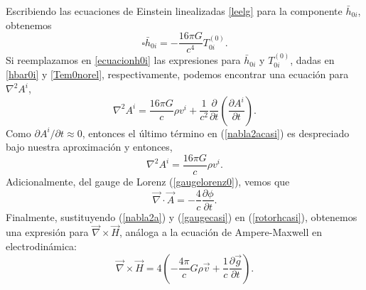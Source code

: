 Escribiendo las ecuaciones de Einstein linealizadas \eqref{leelg} para la componente $\bar{h}_{0i}$, obtenemos
\begin{equation}
\square \bar{h}_{0i}=-\frac{16\pi G}{c^4}T_{0i}^{(0)}.\label{ecuacionh0i}
\end{equation}
Si reemplazamos en \eqref{ecuacionh0i} las expresiones para $\bar{h}_{0i}$ y $T_{0i}^{(0)}$, dadas en \eqref{hbar0i} y \eqref{Tem0norel}, respectivamente, podemos encontrar una ecuación para ${\nabla}^2A^i$,
\begin{equation}
{\nabla}^2A^i=\frac{16\pi G}{c}\rho v^i+\frac{1}{c^2}\frac{\partial}{\partial t}\left(\frac{\partial A^i}{\partial t}\right).\label{nabla2acasi}
\end{equation}
Como $\partial A^i/\partial t\approx0$, entonces el último término en (\ref{nabla2acasi}) es despreciado bajo nuestra aprox\-imación y entonces,
\begin{equation}
{\nabla}^2A^i=\frac{16\pi G}{c}\rho v^i.\label{nabla2a}
\end{equation}
Adicionalmente, del gauge de Lorenz (\ref{gaugelorenz0}), vemos que
\begin{equation}
\vec{\nabla}\cdot\vec{A}=-\frac{4}{c}\frac{\partial \phi}{\partial t}.\label{gaugecasi}
\end{equation}
Finalmente, sustituyendo (\ref{nabla2a}) y (\ref{gaugecasi}) en (\ref{rotorhcasi}), obtenemos una expresión para $\vec{\nabla}\times\vec{H}$, análoga a la ecuación de Ampere-Maxwell en electrodinámica:
\begin{equation}
\vec{\nabla}\times\vec{H}=4\left(-\frac{4\pi}{c}G\rho \vec{v}+\frac{1}{c}\frac{\partial \vec{g}}{\partial t}\right).
\end{equation}

